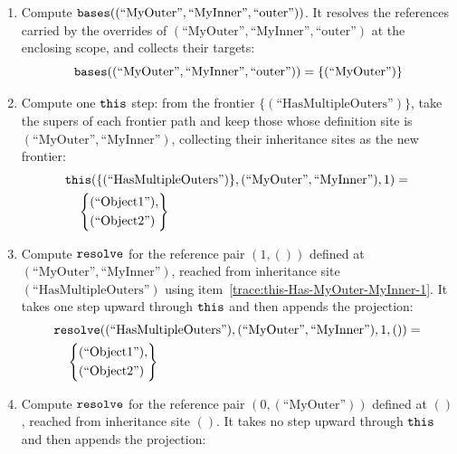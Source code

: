 \begin{enumerate}
\[\begin{aligned}
\begin{aligned}
          &(\text{``Object1''}), \\
          &(\text{``Object2''})
        \end{aligned}\right\}
    \end{aligned}
  \]
  \item \label{trace:bases-MyOuter-MyInner-outer}Compute $\mathtt{bases}((\text{``MyOuter''}, \text{``MyInner''}, \text{``outer''}))$. It resolves the references carried by the overrides of $(\text{``MyOuter''}, \text{``MyInner''}, \text{``outer''})$ at the enclosing scope, and collects their targets:
  \[
    \mathtt{bases}((\text{``MyOuter''}, \text{``MyInner''}, \text{``outer''})) = \{(\text{``MyOuter''})\}
  \]
  \item \label{trace:this-Has-MyOuter-MyInner-1}Compute one $\mathtt{this}$ step: from the frontier $\{(\text{``HasMultipleOuters''})\}$, take the supers of each frontier path and keep those whose definition site is $(\text{``MyOuter''}, \text{``MyInner''})$, collecting their inheritance sites as the new frontier:
  \[
    \begin{aligned}
      &\mathtt{this}(\{(\text{``HasMultipleOuters''})\}, (\text{``MyOuter''}, \text{``MyInner''}), 1) ={} \\
      &\quad \left\{\begin{aligned}
          &(\text{``Object1''}), \\
          &(\text{``Object2''})
        \end{aligned}\right\}
    \end{aligned}
  \]
  \item \label{trace:resolve-Has-MyOuter-MyInner-1}Compute $\mathtt{resolve}$ for the reference pair $(1, ())$ defined at $(\text{``MyOuter''}, \text{``MyInner''})$, reached from inheritance site $(\text{``HasMultipleOuters''})$ using item~\ref{trace:this-Has-MyOuter-MyInner-1}. It takes one step upward through $\mathtt{this}$ and then appends the projection:
  \[
    \begin{aligned}
      &\mathtt{resolve}((\text{``HasMultipleOuters''}), (\text{``MyOuter''}, \text{``MyInner''}), 1, ()) ={} \\
      &\quad \left\{\begin{aligned}
          &(\text{``Object1''}), \\
          &(\text{``Object2''})
        \end{aligned}\right\}
    \end{aligned}
  \]
  \item \label{trace:resolve-0-MyOuter}Compute $\mathtt{resolve}$ for the reference pair $(0, (\text{``MyOuter''}))$ defined at $()$, reached from inheritance site $()$. It takes no step upward through $\mathtt{this}$ and then appends the projection:

\end{enumerate}
